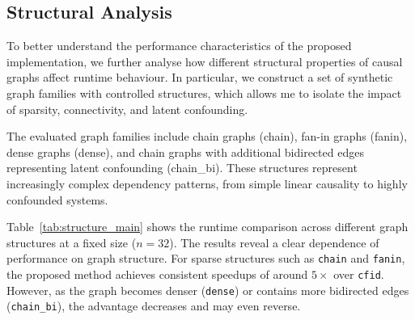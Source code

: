 \documentclass[a4paper]{report}
\begin{document}
\subsection{Structural Analysis}
To better understand the performance characteristics of the proposed implementation, we further analyse how different structural properties of causal graphs affect runtime behaviour. In particular, we construct a set of synthetic graph families with controlled structures, which allows me to isolate the impact of sparsity, connectivity, and latent confounding.

The evaluated graph families include chain graphs (chain), fan-in graphs (fanin), dense graphs (dense), and chain graphs with additional bidirected edges representing latent confounding (chain\_bi). These structures represent increasingly complex dependency patterns, from simple linear causality to highly confounded systems.

\begin{table}[h]
\centering
{}
\caption{Runtime comparison across graph structures ($n=32$, warm median). The Julia pipeline is decomposed into build, simplify, and identification stages (Step4+Step5), while R reports identification via \texttt{identifiable(...)}.}
\label{tab:structure_main}
\end{table}

Table~\ref{tab:structure_main} shows the runtime comparison across different graph structures at a fixed size ($n=32$).  The results reveal a clear dependence of performance on graph structure. For sparse structures such as \texttt{chain} and \texttt{fanin}, the proposed method achieves consistent speedups of around $5\times$ over \texttt{cfid}. However, as the graph becomes denser (\texttt{dense}) or contains more bidirected edges (\texttt{chain\_bi}), the advantage decreases and may even reverse.
\end{document}
